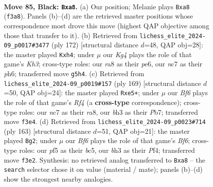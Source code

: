 \documentclass[11pt]{article}
\begin{document}
\clearpage

\begin{figure}[p]\centering
\begin{subfigure}{0.46\textwidth}\centering
\resizebox{\linewidth}{!}{%
\newchessgame
\chessboard[
  setfen={R7/2NR4/8/5Pk1/np4P1/5b1B/7P/6K1 b - - 0 85},
  showmover=false,
  pgfstyle=straightmove, color=movearrow, markmove={f3-a8}
]}
\caption{}
\end{subfigure}\hfill
\begin{subfigure}{0.46\textwidth}\centering
\resizebox{\linewidth}{!}{%
\newchessgame
\chessboard[
  setfen={2B5/8/3kp2p/5p2/7p/4bP1K/8/8 w - - 0 87},
  showmover=false,
  pgfstyle=straightmove, color=movearrow, markmove={h3-h4}
]}
\caption{}
\end{subfigure}
\\[4pt]
\begin{subfigure}{0.46\textwidth}\centering
\resizebox{\linewidth}{!}{%
\newchessgame
\chessboard[
  setfen={R3K3/1p5R/3P4/P3Pr2/8/b2k4/8/8 b - - 0 85},
  showmover=false,
  pgfstyle=straightmove, color=movearrow, markmove={f5-e5}
]}
\caption{}
\end{subfigure}\hfill
\begin{subfigure}{0.46\textwidth}\centering
\resizebox{\linewidth}{!}{%
\newchessgame
\chessboard[
  setfen={8/8/8/2B3K1/1Pk2pP1/5b1P/8/8 b - - 0 82},
  showmover=false,
  pgfstyle=straightmove, color=movearrow, markmove={f3-g2}
]}
\caption{}
\end{subfigure}
\caption{\textbf{Move 85, Black: \texttt{Bxa8}.} (a) Our position; Melanie plays \texttt{Bxa8} (\texttt{f3a8}). Panels (b)--(d) are the retrieved master positions whose correspondence most drove this move (highest QAP objective among those that transfer to it). (b) Retrieved from \texttt{lichess\_elite\_2024-09\_p0017\#3477} (ply 172) [structural distance $d$=48, QAP obj=28]: the master played \texttt{Kxh4}; under $\mu$ our \emph{Kg4} plays the role of that game's \emph{Kh3}; cross-type roles: our \emph{r}a8 as their \emph{p}e6, our \emph{n}c7 as their \emph{p}h6; transferred move \texttt{g5h4}. (c) Retrieved from \texttt{lichess\_elite\_2024-09\_p0019\#157} (ply 169) [structural distance $d$=50, QAP obj=24]: the master played \texttt{Rxe5+}; under $\mu$ our \emph{Bf6} plays the role of that game's \emph{Rf4} (a \textbf{cross-type} correspondence); cross-type roles: our \emph{n}c7 as their \emph{r}a8, our \emph{b}h3 as their \emph{P}b7; transferred move \texttt{f3e4}. (d) Retrieved from \texttt{lichess\_elite\_2024-09\_p0023\#714} (ply 163) [structural distance $d$=51, QAP obj=21]: the master played \texttt{Bg2}; under $\mu$ our \emph{Bf6} plays the role of that game's \emph{Bf6}; cross-type roles: our \emph{p}f5 as their \emph{b}c5, our \emph{b}h3 as their \emph{P}f4; transferred move \texttt{f3e2}. Synthesis: no retrieved analog transferred to \texttt{Bxa8} -- the \texttt{search} selector chose it on value (material / mate); panels (b)--(d) show the strongest nearby analogies.}
\label{fig:thought-m169}
\end{figure}
\end{document}
